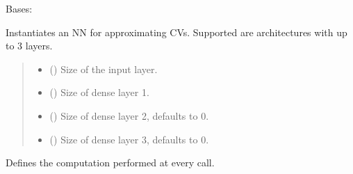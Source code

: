 \documentclass[a4paper,10pt,english]{report}
\begin{document}
\begin{fulllineitems}
\label{\detokenize{NNucleate:NNucleate.models.NNCV}}
\pysigstartsignatures
{}
\pysigstopsignatures
\sphinxAtStartPar
Bases: 

\sphinxAtStartPar
Instantiates an NN for approximating CVs. Supported are architectures with up to 3 layers.
\begin{quote}\begin{description}
\begin{itemize}
\item {} 
\sphinxAtStartPar
{} () \textendash{} Size of the input layer.

\item {} 
\sphinxAtStartPar
{} () \textendash{} Size of dense layer 1.

\item {} 
\sphinxAtStartPar
{} (\sphinxstyleliteralemphasis{\sphinxupquote{, }}) \textendash{} Size of dense layer 2, defaults to 0.

\item {} 
\sphinxAtStartPar
{} (\sphinxstyleliteralemphasis{\sphinxupquote{, }}) \textendash{} Size of dense layer 3, defaults to 0.

\end{itemize}

\end{description}\end{quote}

\begin{fulllineitems}
\label{\detokenize{NNucleate:NNucleate.models.NNCV.forward}}
\pysigstartsignatures
{}
\pysigstopsignatures
\sphinxAtStartPar
Defines the computation performed at every call.


\end{fulllineitems}
\end{fulllineitems}
\end{document}
